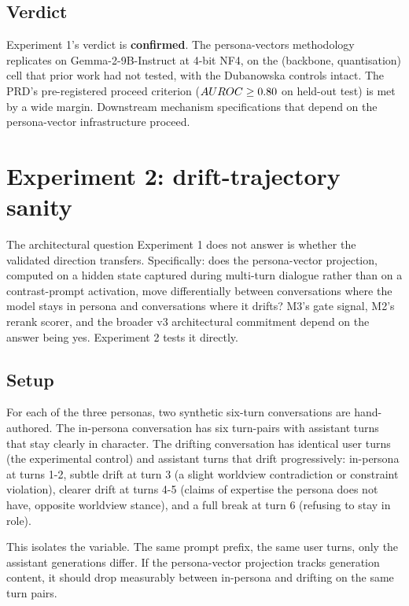 \subsection{Verdict}

Experiment 1's verdict is \textbf{confirmed}. The persona-vectors methodology replicates on Gemma-2-9B-Instruct at 4-bit NF4, on the (backbone, quantisation) cell that prior work had not tested, with the Dubanowska controls intact. The PRD's pre-registered proceed criterion ($AUROC{} \geq 0.80$ on held-out test) is met by a wide margin. Downstream mechanism specifications that depend on the persona-vector infrastructure proceed.

\section{Experiment 2: drift-trajectory sanity}
\label{sec:experiment-2}

The architectural question Experiment 1 does not answer is whether the validated direction transfers. Specifically: does the persona-vector projection, computed on a hidden state captured during multi-turn dialogue rather than on a contrast-prompt activation, move differentially between conversations where the model stays in persona and conversations where it drifts? M3's gate signal, M2's rerank scorer, and the broader v3 architectural commitment depend on the answer being yes. Experiment 2 tests it directly.

\subsection{Setup}

For each of the three personas, two synthetic six-turn conversations are hand-authored. The in-persona conversation has six turn-pairs with assistant turns that stay clearly in character. The drifting conversation has identical user turns (the experimental control) and assistant turns that drift progressively: in-persona at turns 1-2, subtle drift at turn 3 (a slight worldview contradiction or constraint violation), clearer drift at turns 4-5 (claims of expertise the persona does not have, opposite worldview stance), and a full break at turn 6 (refusing to stay in role).

This isolates the variable. The same prompt prefix, the same user turns, only the assistant generations differ. If the persona-vector projection tracks generation content, it should drop measurably between in-persona and drifting on the same turn pairs.

